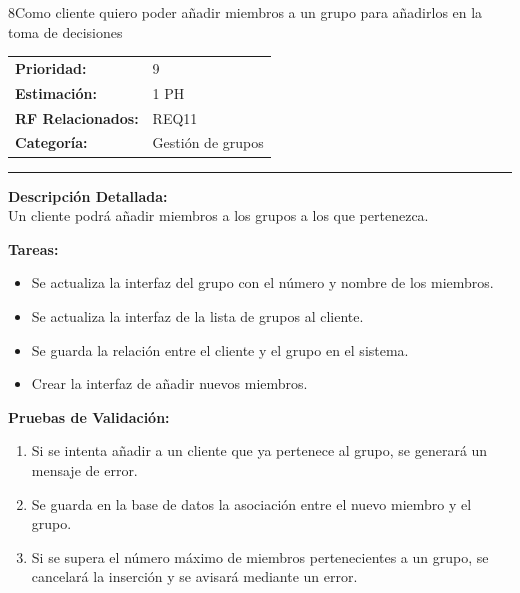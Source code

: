 \begin{hu_card}{8}{Como cliente quiero poder añadir miembros a un grupo para añadirlos en la toma de decisiones}
    \begin{tabularx}{\linewidth}{l X}
        \textbf{Prioridad:}   & 9\\
        \textbf{Estimación:}  & 1 PH \\
        \textbf{RF Relacionados:} & REQ11 \\
        \textbf{Categoría:} & Gestión de grupos \\
    \end{tabularx}

    \vspace{2mm}
    \hrule
    \vspace{2mm}

    \textbf{Descripción Detallada:} \\
    Un cliente podrá añadir miembros a los grupos a los que pertenezca.

    \vspace{2mm}
    \textbf{Tareas:}
    \begin{itemize}[noitemsep, topsep=0pt]
        \item Se actualiza la interfaz del grupo con el número y nombre de los miembros.
        \item Se actualiza la interfaz de la lista de grupos al cliente.
        \item Se guarda la relación entre el cliente y el grupo en el sistema.
        \item Crear la interfaz de añadir nuevos miembros.
    \end{itemize}

    \vspace{2mm}
    \textbf{Pruebas de Validación:}
    \begin{enumerate}[noitemsep, topsep=0pt]
        \item Si se intenta añadir a un cliente que ya pertenece al grupo, se generará un mensaje de error.
        \item Se guarda en la base de datos la asociación entre el nuevo miembro y el grupo.
        \item Si se supera el número máximo de miembros pertenecientes a un grupo, se cancelará la inserción y se avisará mediante un error.
    \end{enumerate}
\end{hu_card}


